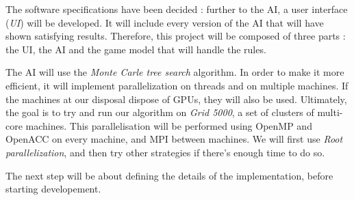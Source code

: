 The software specifications have been decided : further to the AI, a user interface (\emph{UI}) will be developed.
It will include every version of the AI that will have shown satisfying results.
Therefore, this project will be composed of three parts : the UI, the AI and the game model that will handle the rules.

The AI will use the \emph{Monte Carle tree search} algorithm.
In order to make it more efficient, it will implement parallelization on threads and on multiple machines.
If the machines at our disposal dispose of GPUs, they will also be used.
Ultimately, the goal is to try and run our algorithm on \emph{Grid 5000}, a set of clusters of multi-core machines.
This parallelisation will be performed using OpenMP and OpenACC on every machine, and MPI between machines.
We will first use \emph{Root parallelization}, and then try other strategies if there's enough time to do so.

The next step will be about defining the details of the implementation, before starting developement.